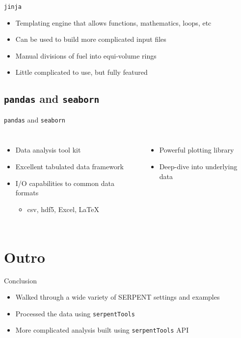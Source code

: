 \documentclass{beamer}
\newcommand{\st}{\texttt{serpentTools} }
\begin{document}
\begin{frame}{\texttt{jinja}}
    \begin{itemize}
        \item{Templating engine that allows functions, mathematics, loops, etc}
        \item{Can be used to build more complicated input files}
        \item{Manual divisions of fuel into equi-volume rings}
        \item{Little complicated to use, but fully featured}
    \end{itemize}
\end{frame}

\subsection{\texttt{pandas} and \texttt{seaborn}}
\begin{frame}{\texttt{pandas} and \texttt{seaborn}}
    \begin{columns}
        \begin{itemize}
            \item{Data analysis tool kit}
            \item{Excellent tabulated data framework}
            \item{I/O capabilities to common data formats}
            \begin{itemize}
                \item{csv, hdf5, Excel, \LaTeX}
            \end{itemize}
        \end{itemize}

        \begin{itemize}
            \item{Powerful plotting library}
            \item{Deep-dive into underlying data}
        \end{itemize}
    \end{columns}
\end{frame}


\section*{Outro}

\begin{frame}{Conclusion}
    \begin{itemize}
        \item Walked through a wide variety of SERPENT settings and examples
        \item Processed the data using \st
        \item More complicated analysis built using \st API
    \end{itemize}
\end{frame}
\end{document}
